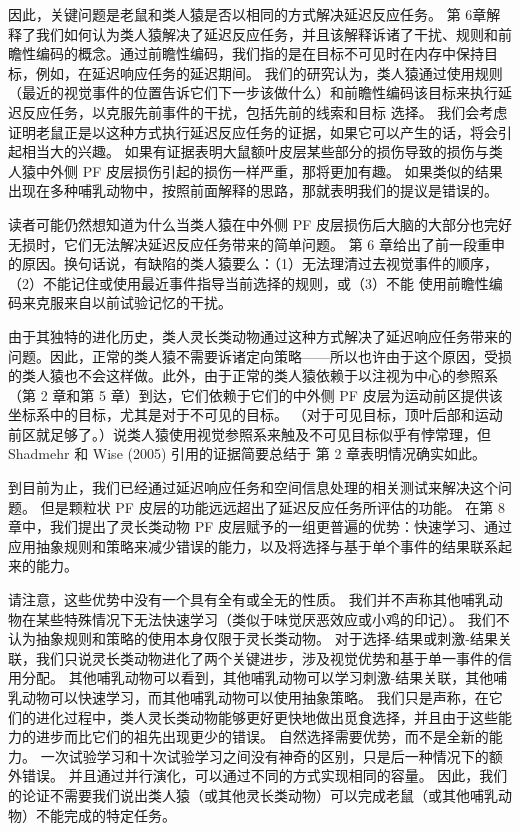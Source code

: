 \par 
因此，关键问题是老鼠和类人猿是否以相同的方式解决延迟反应任务。 第 6章解释了我们如何认为类人猿解决了延迟反应任务，并且该解释诉诸了干扰、规则和前瞻性编码的概念。通过前瞻性编码，我们指的是在目标不可见时在内存中保持目标，例如，在延迟响应任务的延迟期间。 我们的研究认为，类人猿通过使用规则（最近的视觉事件的位置告诉它们下一步该做什么）和前瞻性编码该目标来执行延迟反应任务，以克服先前事件的干扰，包括先前的线索和目标 选择。 我们会考虑证明老鼠正是以这种方式执行延迟反应任务的证据，如果它可以产生的话，将会引起相当大的兴趣。 如果有证据表明大鼠额叶皮层某些部分的损伤导致的损伤与类人猿中外侧 PF 皮层损伤引起的损伤一样严重，那将更加有趣。 如果类似的结果出现在多种哺乳动物中，按照前面解释的思路，那就表明我们的提议是错误的。
\par 
读者可能仍然想知道为什么当类人猿在中外侧 PF 皮层损伤后大脑的大部分也完好无损时，它们无法解决延迟反应任务带来的简单问题。 第 6 章给出了前一段重申的原因。换句话说，有缺陷的类人猿要么：（1）无法理清过去视觉事件的顺序，（2）不能记住或使用最近事件指导当前选择的规则，或（3）不能 使用前瞻性编码来克服来自以前试验记忆的干扰。
\par 
由于其独特的进化历史，类人灵长类动物通过这种方式解决了延迟响应任务带来的问题。因此，正常的类人猿不需要诉诸定向策略——所以也许由于这个原因，受损的类人猿也不会这样做。此外，由于正常的类人猿依赖于以注视为中心的参照系（第 2 章和第 5 章）到达，它们依赖于它们的中外侧 PF 皮层为运动前区提供该坐标系中的目标，尤其是对于不可见的目标。 （对于可见目标，顶叶后部和运动前区就足够了。）说类人猿使用视觉参照系来触及不可见目标似乎有悖常理，但 Shadmehr 和 Wise (2005) 引用的证据简要总结于 第 2 章表明情况确实如此。
\par 
到目前为止，我们已经通过延迟响应任务和空间信息处理的相关测试来解决这个问题。 但是颗粒状 PF 皮层的功能远远超出了延迟反应任务所评估的功能。 在第 8 章中，我们提出了灵长类动物 PF 皮层赋予的一组更普遍的优势：快速学习、通过应用抽象规则和策略来减少错误的能力，以及将选择与基于单个事件的结果联系起来的能力。
\par 
请注意，这些优势中没有一个具有全有或全无的性质。 我们并不声称其他哺乳动物在某些特殊情况下无法快速学习（类似于味觉厌恶效应或小鸡的印记）。 我们不认为抽象规则和策略的使用本身仅限于灵长类动物。 对于选择-结果或刺激-结果关联，我们只说灵长类动物进化了两个关键进步，涉及视觉优势和基于单一事件的信用分配。 其他哺乳动物可以看到，其他哺乳动物可以学习刺激-结果关联，其他哺乳动物可以快速学习，而其他哺乳动物可以使用抽象策略。 我们只是声称，在它们的进化过程中，类人灵长类动物能够更好更快地做出觅食选择，并且由于这些能力的进步而比它们的祖先出现更少的错误。 自然选择需要优势，而不是全新的能力。 一次试验学习和十次试验学习之间没有神奇的区别，只是后一种情况下的额外错误。 并且通过并行演化，可以通过不同的方式实现相同的容量。 因此，我们的论证不需要我们说出类人猿（或其他灵长类动物）可以完成老鼠（或其他哺乳动物）不能完成的特定任务。
